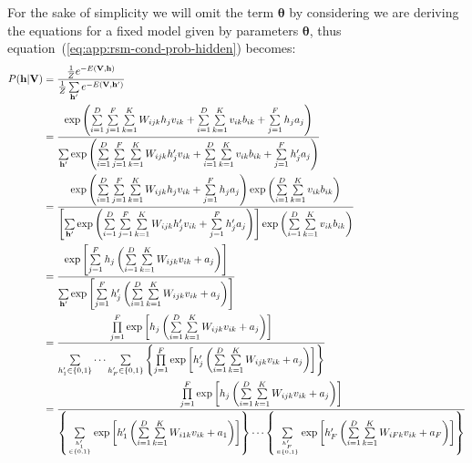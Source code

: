 For the sake of simplicity we will omit the term $\bm{\theta}$ by considering we are deriving the equations for a fixed model given by parameters $\bm{\theta}$, thus equation~(\ref{eq:app:rsm-cond-prob-hidden}) becomes: 
\begin{align}
    \label{eq:app:rsm-cond-prob-hidden-init}
    P(\mathbf{h} | \mathbf{V}) &= \frac{\frac{1}{Z} e^{-E(\mathbf{V}, \mathbf{h})}}{\frac{1}{Z} \sum\limits_{\mathbf{h}'} e^{-E(\mathbf{V}, \mathbf{h}')}} \\ %
    &= \frac{\exp{\left( \sum\limits^{D}_{i=1} \sum\limits^{F}_{j=1} \sum\limits^{K}_{k=1} W_{ijk} h_{j} v_{ik} + \sum\limits^{D}_{i=1} \sum\limits^{K}_{k=1} v_{ik} b_{ik} + \sum\limits^{F}_{j=1} h_{j} a_{j} \right)}}{\sum\limits_{\mathbf{h}'} \exp{\left( \sum\limits^{D}_{i=1} \sum\limits^{F}_{j=1} \sum\limits^{K}_{k=1} W_{ijk} h'_{j} v_{ik} + \sum\limits^{D}_{i=1} \sum\limits^{K}_{k=1} v_{ik} b_{ik} + \sum\limits^{F}_{j=1} h'_{j} a_{j}\right)}} \nonumber \\ %
    &= \frac{\exp{\left( \sum\limits^{D}_{i=1} \sum\limits^{F}_{j=1} \sum\limits^{K}_{k=1} W_{ijk} h_{j} v_{ik} + \sum\limits^{F}_{j=1} h_{j} a_{j}\right) \exp{\left( \sum\limits^{D}_{i=1} \sum\limits^{K}_{k=1} v_{ik} b_{ik}\right)}}}{\left[ \sum\limits_{\mathbf{h}'} \exp{\left( \sum\limits^{D}_{i=1} \sum\limits^{F}_{j=1} \sum\limits^{K}_{k=1} W_{ijk} h'_{j} v_{ik} + \sum\limits^{F}_{j=1} h'_{j} a_{j}\right)}\right] \exp{\left( \sum\limits^{D}_{i=1} \sum\limits^{K}_{k=1} v_{ik} b_{ik}\right)}} \nonumber \\ %
    &= \frac{\exp{\left[ \sum\limits^{F}_{j=1} h_{j} \left( \sum\limits^{D}_{i=1} \sum\limits^{K}_{k=1} W_{ijk} v_{ik} + a_{j}\right)\right]}}{\sum\limits_{\mathbf{h}'} \exp{\left[ \sum\limits^{F}_{j=1} h'_{j} \left( \sum\limits^{D}_{i=1} \sum\limits^{K}_{k=1} W_{ijk} v_{ik} + a_{j}\right)\right]}} \nonumber \\ %
    &= \frac{\prod\limits^{F}_{j=1} \exp{\left[h_{j} \left( \sum\limits^{D}_{i=1} \sum\limits^{K}_{k=1} W_{ijk} v_{ik} + a_{j}\right)\right]}}{\sum\limits_{h'_{1} \in \{0,1\}} \cdots \sum\limits_{h'_{F} \in \{0,1\}} \left\{ \prod\limits^{F}_{j=1} \exp{\left[h'_{j} \left( \sum\limits^{D}_{i=1} \sum\limits^{K}_{k=1} W_{ijk} v_{ik} + a_{j}\right)\right]}\right\}} \nonumber \\ %
    &= \frac{\prod\limits^{F}_{j=1} \exp{\left[h_{j} \left(\sum\limits^{D}_{i=1} \sum\limits^{K}_{k=1} W_{ijk} v_{ik} + a_{j}\right)\right]}}{\left\{ \sum\limits_{h'_{1} \atop \in \{0,1\}} \exp{\left[h'_{1} \left( \sum\limits^{D}_{i=1} \sum\limits^{K}_{k=1} W_{i1k} v_{ik} + a_{1}\right)\right]}\right\} \cdots \left\{ \sum\limits_{h'_{F} \atop \in \{0,1\}} \exp{\left[h'_{F} \left( \sum\limits^{D}_{i=1} \sum\limits^{K}_{k=1} W_{iFk} v_{ik} + a_{F}\right)\right]}\right\}}  \nonumber \\ %

\end{align}
